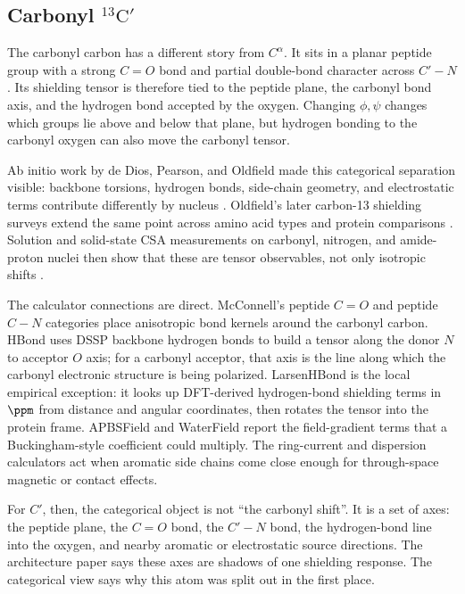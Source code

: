 \documentclass[11pt]{article}
\begin{document}
\subsection{\texorpdfstring{Carbonyl \(^{13}\mathrm C'\)}
{Carbonyl 13C-prime}}

The carbonyl carbon has a different story from \(C^\alpha\). It sits in a
planar peptide group with a strong \(C=O\) bond and partial double-bond
character across \(C'-N\). Its shielding tensor is therefore tied to the peptide
plane, the carbonyl bond axis, and the hydrogen bond accepted by the oxygen.
Changing \(\phi,\psi\) changes which groups lie above and below that plane, but
hydrogen bonding to the carbonyl oxygen can also move the carbonyl tensor.

Ab initio work by de Dios, Pearson, and Oldfield made this categorical
separation visible: backbone torsions, hydrogen bonds, side-chain geometry, and
electrostatic terms contribute differently by nucleus \cite{dedios1993}.
Oldfield's later carbon-13 shielding surveys extend the same point across amino
acid types and protein comparisons \cite{oldfield1995,havlin2001}. Solution and
solid-state CSA measurements on carbonyl, nitrogen, and amide-proton nuclei
then show that these are tensor observables, not only isotropic shifts
\cite{loth2005}.

The calculator connections are direct. McConnell's peptide \(C=O\) and
peptide \(C-N\) categories place anisotropic bond kernels around the carbonyl
carbon. HBond uses DSSP backbone hydrogen bonds to build a tensor along the
donor \(N\) to acceptor \(O\) axis; for a carbonyl acceptor, that axis is the
line along which the carbonyl electronic structure is being polarized.
LarsenHBond is the local empirical exception: it looks up DFT-derived
hydrogen-bond shielding terms in \(\si{\ppm}\) from distance and angular
coordinates, then rotates the tensor into the protein frame. APBSField and
WaterField report the field-gradient terms that a Buckingham-style coefficient
could multiply. The ring-current and dispersion calculators act when aromatic
side chains come close enough for through-space magnetic or contact effects.

For \(C'\), then, the categorical object is not ``the carbonyl shift''. It is a
set of axes: the peptide plane, the \(C=O\) bond, the \(C'-N\) bond, the
hydrogen-bond line into the oxygen, and nearby aromatic or electrostatic source
directions. The architecture paper says these axes are shadows of one shielding
response. The categorical view says why this atom was split out in the first
place.
\end{document}
